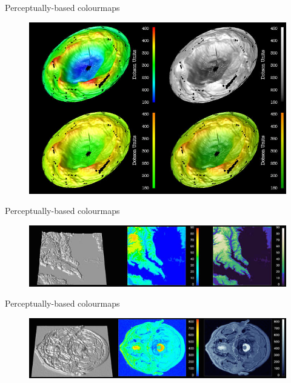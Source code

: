 \documentclass[10pt,presentation,compress]{beamer}
\begin{document}
\begin{frame}{Perceptually-based colourmaps}
  \begin{figure}[htp]
    \includegraphics[scale=7.0]{perceptual1.jpg}
  \end{figure}
\end{frame}

\begin{frame}{Perceptually-based colourmaps}
  \begin{figure}[htp]
    \includegraphics[scale=0.55]{pchesapeake.png}
  \end{figure}
\end{frame}

\begin{frame}{Perceptually-based colourmaps}
  \begin{figure}[htp]
    \includegraphics[scale=0.55]{pmri.png}
  \end{figure}
\end{frame}
\end{document}
